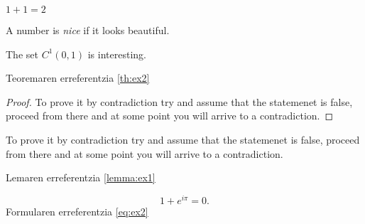 \begin{theorem}[Sum]\label{th:ex1}
	$1+1=2$
\end{theorem}

\begin{definition}\label{def:ex1}
	A number is \emph{nice} if it looks beautiful.
\end{definition}

\begin{theorem}[About $C^{1}(0,1)$]\label{th:ex2}
	The set $C^{1}(0,1)$ is interesting.
\end{theorem}
Teoremaren erreferentzia \ref{th:ex2}

\begin{proof}\label{pf:ex1}
	To prove it by contradiction try and assume that the statemenet is false,
	proceed from there and at some point you will arrive to a contradiction.
\end{proof}



\begin{lemma}\label{lemma:ex1}
	To prove it by contradiction try and assume that the statemenet is false,
	proceed from there and at some point you will arrive to a contradiction.
\end{lemma}

Lemaren erreferentzia \ref{lemma:ex1}


\begin{equation}\label{eq:ex2}
	1 + e^{i \pi} = 0.
\end{equation}
Formularen erreferentzia \ref{eq:ex2}